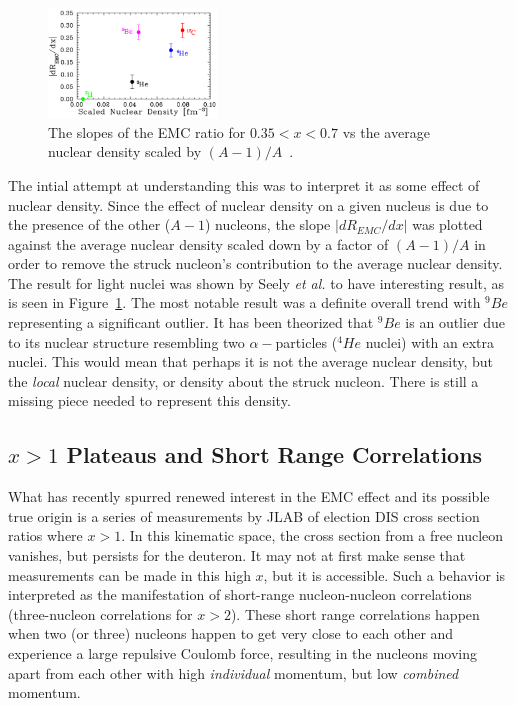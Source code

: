 \begin{figure}
	\centering
	\includegraphics[width=0.4\textwidth]{figures/background/emc-vs-density.png}
	\caption{The slopes of the EMC ratio for $0.35<x<0.7$ vs the average nuclear density scaled by $(A-1)/A$~\cite{Seely:2009gt}.}
	\label{fig:emc-slope-vs-density}
\end{figure}
The intial attempt at understanding this was to interpret it as some effect of nuclear density. Since the effect of nuclear density on a given nucleus is due to the presence of the other ($A-1$) nucleons, the slope $|dR_{EMC}/dx|$ was plotted against the average nuclear density scaled down by a factor of $(A-1)/A$ in order to remove the struck nucleon’s contribution to the average nuclear density. The result for light nuclei was shown by Seely \emph{et al.} to have interesting result, as is seen in Figure~\ref{fig:emc-slope-vs-density}. The most notable result was a definite overall trend with $^9Be$ representing a significant outlier. It has been theorized that $^9Be$ is an outlier due to its nuclear structure resembling two $\alpha-$particles ($^4He$ nuclei) with an extra nuclei. This would mean that perhaps it is not the average nuclear density, but the \emph{local} nuclear density, or density about the struck nucleon. There is still a missing piece needed to represent this density.



\subsection{$x>1$ Plateaus and Short Range Correlations}

What has recently spurred renewed interest in the EMC effect and its possible true origin is a series of measurements by JLAB of election DIS cross section ratios where $x>1$. In this kinematic space, the cross section from a free nucleon vanishes, but persists for the deuteron. It may not at first make sense that measurements can be made in this high $x$, but it is accessible. Such a behavior is interpreted as the manifestation of short-range nucleon-nucleon correlations (three-nucleon correlations for $x>2$). These short range correlations happen when two (or three) nucleons happen to get very close to each other and experience a large repulsive Coulomb force, resulting in the nucleons moving apart from each other with high \emph{individual} momentum, but low \emph{combined} momentum.

